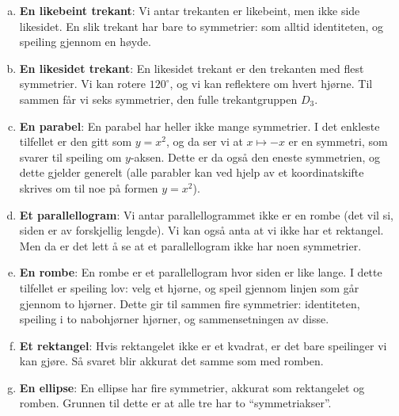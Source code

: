 \documentclass[11pt, norsk]{article}
\begin{document}
\begin{losn}
\begin{enumerate}[a)]
\item \textbf{En likebeint trekant}: Vi antar trekanten er likebeint, men ikke side likesidet. En slik trekant har bare to symmetrier: som alltid identiteten, og speiling gjennom en høyde.
\item \textbf{En likesidet trekant}: En likesidet trekant er den trekanten med flest symmetrier. Vi kan rotere $120^\circ$, og vi kan reflektere om hvert hjørne. Til sammen får vi seks symmetrier, den fulle trekantgruppen $D_3$.
\item \textbf{En parabel}: En parabel har heller ikke mange symmetrier. I det enkleste tilfellet er den gitt som $y=x^2$, og da ser vi at $x \mapsto -x$ er en symmetri, som svarer til speiling om $y$-aksen. Dette er da også den eneste symmetrien, og dette gjelder generelt (alle parabler kan ved hjelp av et koordinatskifte skrives om til noe på formen $y=x^2$). 
\item \textbf{Et parallellogram}: Vi antar parallellogrammet ikke er en rombe (det vil si, siden er av forskjellig lengde). Vi kan også anta at vi ikke har et rektangel. Men da er det lett å se at et parallellogram ikke har noen symmetrier.
\item \textbf{En rombe}: En rombe er et parallellogram hvor siden er like lange. I dette tilfellet er speiling lov: velg et hjørne, og speil gjennom linjen som går gjennom to hjørner. Dette gir til sammen fire symmetrier: identiteten, speiling i to nabohjørner hjørner, og sammensetningen av disse.
\item \textbf{Et rektangel}: Hvis rektangelet ikke er et kvadrat, er det bare speilinger vi kan gjøre. Så svaret blir 
akkurat det samme som med romben.
\item \textbf{En ellipse}: En ellipse har fire symmetrier, akkurat som rektangelet og romben. Grunnen til dette er at 
alle tre har to ``symmetriakser''.
\end{enumerate}

\end{losn}
\end{document}

